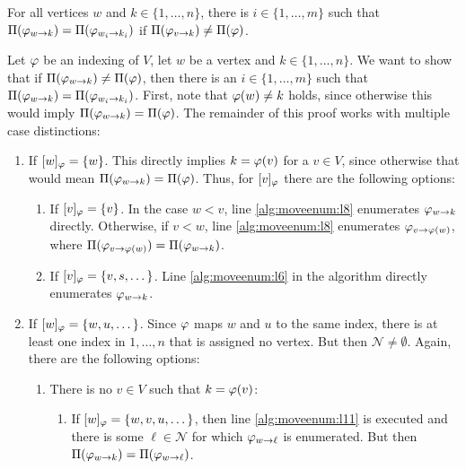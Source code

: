 \begin{lemmarep}[Completeness]
    For all vertices $w$ and $k \in \{1,\dots,n\}$, there is $i\in \{1,\dots,m\}$ such that $\Pi(\varphi_{w\rightarrow k}) = \Pi(\varphi_{w_i\rightarrow k_i})$ if $\Pi(\varphi_{v\rightarrow k}) \neq \Pi(\varphi)$.\label{lemma:completeness}
\end{lemmarep}
\begin{\appendixproof}
    Let $\varphi$ be an indexing of $V$, let $w$ be a vertex and $k\in\{1,\dots,n\}$. We want to show that if $\Pi(\varphi_{w\rightarrow k}) \neq \Pi(\varphi)$, then there is an $i\in \{1,\dots,m\}$ such that $\Pi(\varphi_{w\rightarrow k}) = \Pi(\varphi_{w_i\rightarrow k_i})$. First, note that $\varphi(w)\neq k$ holds, since otherwise this would imply $\Pi(\varphi_{w\rightarrow k}) = \Pi(\varphi)$. The remainder of this proof works with multiple case distinctions:
    \begin{enumerate}
        \item If $[w]_\varphi = \{ w \}$. This directly implies $k = \varphi(v)$ for a $v \in V$, since otherwise that would mean $\Pi(\varphi_{w\rightarrow k}) = \Pi(\varphi)$. Thus, for $[v]_\varphi$ there are the following options:
        \begin{enumerate}
            \item If $[v]_\varphi = \{ v \}$. In the case $w < v$, line \ref{alg:moveenum:l8} enumerates $\varphi_{w\rightarrow k}$ directly.  Otherwise, if $v < w$, line \ref{alg:moveenum:l8} enumerates $\varphi_{v\rightarrow \varphi(w)}$, where $\Pi(\varphi_{v\rightarrow \varphi(w)}) = \Pi(\varphi_{w\rightarrow k})$. 
            \item If $[v]_\varphi = \{ v,s,\dots \}$. Line \ref{alg:moveenum:l6} in the algorithm directly enumerates $\varphi_{w\rightarrow k}$.
        \end{enumerate} 
        \item If $[w]_\varphi = \{ w,u, \dots \}$. Since $\varphi$ maps $w$ and $u$ to the same index, there is at least one index in $1,\dots,n$ that is assigned no vertex. But then $\mathcal{N} \neq \emptyset$. Again, there are the following options:
        \begin{enumerate}
            \item There is no $v \in V$ such that $k = \varphi(v)$: 
            \begin{enumerate}
                \item If $[w]_\varphi = \{ w,v,u,\dots \}$, then line \ref{alg:moveenum:l11} is executed and there is some $\ell \in \mathcal{N}$ for which $\varphi_{w\rightarrow \ell}$ is enumerated. But then $\Pi(\varphi_{w\rightarrow k})=\Pi(\varphi_{w\rightarrow \ell})$.

\end{enumerate}
\end{enumerate}
\end{enumerate}
\end{\appendixproof}
